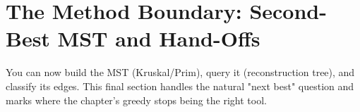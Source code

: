 \section{The Method Boundary: Second-Best MST and Hand-Offs}\label{sec:c17-boundary}

\begin{previouslybox}
You can now build the MST (Kruskal/Prim), query it (reconstruction tree), and
classify its edges.  This final section handles the natural "next best" question
and marks where the chapter's greedy stops being the right tool.
\end{previouslybox}

